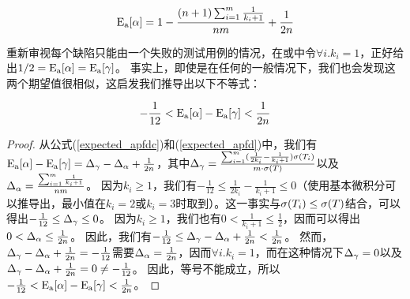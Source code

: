 \begin{mycorollary}
\begin{equation}\label{expected_apfd}
    \mathrm{E_a}[\mathrm{\alpha}]=1-\frac{(n+1)\sum_{i=1}^m \frac{1}{k_i+1}}{nm}+\frac{1}{2n}
\end{equation}
\end{mycorollary}
重新审视每个缺陷只能由一个失败的测试用例\detect{}的情况，在或中令$\forall i.k_i=1$，正好给出$1/2=\mathrm{E_a}[\mathrm{\alpha}]=\mathrm{E_a}[\mathrm{\gamma}]$。
事实上，即使是在任何\mappingMatrix{}的一般情况下，我们也会发现这两个期望值很相似，这启发我们推导出以下不等式：
\begin{mytheorem}\label{difference_with_interleaving}
\begin{equation}
    -\frac{1}{12}<\mathrm{E_a}[\mathrm{\alpha}]-\mathrm{E_a}[\mathrm{\gamma}]<\frac{1}{2n}
\end{equation}
\end{mytheorem}
\begin{proof}
从公式(\ref{expected_apfdc})和(\ref{expected_apfd})中，我们有$\mathrm{E_a}[\mathrm{\alpha}]-\mathrm{E_a}[\mathrm{\gamma}]=\Delta_{\mathrm{\gamma}{}}-\Delta_{\mathrm{\alpha}{}}+\frac{1}{2n}$，其中$\Delta_{\mathrm{\gamma}{}}=\frac{\sum_{i=1}^m(\frac{1}{2k_i}-\frac{1}{k_i+1})\sigma(T_i)}{m\cdot \sigma(T)}$以及$\Delta_{\mathrm{\alpha}{}}=\frac{\sum_{i=1}^m\frac{1}{k_i+1}}{nm}$。
因为$k_i\ge 1$，我们有$-\frac{1}{12}\le\frac{1}{2k_i}-\frac{1}{k_i+1}\le 0$（使用基本微积分可以推导出，最小值在$k_i=2$或$k_i=3$时取到）。这一事实与$\sigma(T_i)\le \sigma(T)$结合，可以得出$-\frac{1}{12}\le \Delta_{\mathrm{\gamma}{}}\le 0$。
因为$k_i\ge 1$，我们也有$0<\frac{1}{k_i+1}\le \frac{1}{2}$，因而可以得出$0< \Delta_{\mathrm{\alpha}{}}\le \frac{1}{2n}$。
因此，我们有$-\frac{1}{12}\le \Delta_{\mathrm{\gamma}{}}-\Delta_{\mathrm{\alpha}{}}+\frac{1}{2n}< \frac{1}{2n}$。
然而，$\Delta_{\mathrm{\gamma}{}}-\Delta_{\mathrm{\alpha}{}}+\frac{1}{2n}=-\frac{1}{12}$需要$\Delta_{\mathrm{\alpha}{}}=\frac{1}{2n}$，因而$\forall i.k_i=1$，而在这种情况下$\Delta_{\mathrm{\gamma}{}}=0$以及$\Delta_{\mathrm{\gamma}{}}-\Delta_{\mathrm{\alpha}{}}+\frac{1}{2n}=0\ne -\frac{1}{12}$。
因此，等号不能成立，所以$-\frac{1}{12}<\mathrm{E_a}[\mathrm{\alpha}]-\mathrm{E_a}[\mathrm{\gamma}]<\frac{1}{2n}$。
\end{proof}
